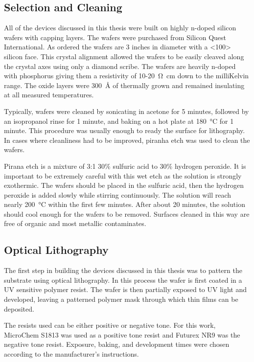 \subsection{Selection and Cleaning}

All of the devices discussed in this thesis were built on highly n-doped silicon wafers with  capping layers. The wafers were purchased from Silicon Quest International. As ordered the wafers are 3 inches in diameter with a <100> silicon face. This crystal alignment allowed the wafers to be easily cleaved along the crystal axes using only a diamond scribe. The wafers are heavily n-doped with phosphorus giving them a resistivity of 10-\SI{20}{\ohm\centi\meter} down to the milliKelvin range. The oxide layers were \SI{300}{\angstrom} of thermally grown  and remained insulating at all measured temperatures.

Typically, wafers were cleaned by sonicating in acetone for 5 minutes, followed by an isopropanol rinse for 1 minute, and baking on a hot plate at \SI{180}{\degreeCelsius} for 1 minute. This procedure was usually enough to ready the surface for lithography. In cases where cleanliness had to be improved, piranha etch was used to clean the wafers. 

Pirana etch is a mixture of 3:1 30\% sulfuric acid to 30\% hydrogen peroxide. It is important to be extremely careful with this wet etch as the solution is strongly exothermic. The wafers should be placed in the sulfuric acid, then the hydrogen peroxide is added slowly while stirring continuously. The solution will reach nearly \SI{200}{\degreeCelsius} within the first few minutes. After about 20 minutes, the solution should cool enough for the wafers to be removed. Surfaces cleaned in this way are free of organic and most metallic contaminates.

\subsection{Optical Lithography}
\label{subsec:optical}

The first step in building the devices discussed in this thesis was to pattern the substrate using optical lithography. In this process the wafer is first coated in a UV sensitive polymer resist. The wafer is then partially exposed to UV light and developed, leaving a patterned polymer mask through which thin films can be deposited.

The resists used can be either positive or negative tone. For this work, MicroChem S1813 was used as a positive tone resist and Futurex NR9 was the negative tone resist. Exposure, baking, and development times were chosen according to the manufacturer's instructions.

